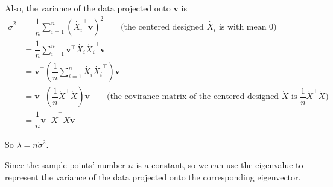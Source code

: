 Also, the variance of the data projected onto $\mathbf{v}$ is
\begin{align*}
\dot{\sigma}^2 &= \dfrac{1}{n}\sum\limits_{i=1}^n \left(\dot{X_i}^{\top}\mathbf{v}\right)^2 \qquad \text{(the centered designed $\dot{X_i}$ is with mean 0)} \\
&= \dfrac{1}{n}\sum\limits_{i=1}^n \mathbf{v}^{\top}\dot{X_i}\dot{X_i}^{\top}\mathbf{v} \\
&= \mathbf{v}^{\top}\left(\dfrac{1}{n}\sum\limits_{i=1}^n\dot{X_i}\dot{X_i}^{\top}\right)\mathbf{v} \\
&= \mathbf{v}^{\top}\left(\dfrac{1}{n}\dot{X}^{\top}\dot{X}\right)\mathbf{v}\qquad \text{(the covirance matrix of the centered designed $\dot{X}$ is $\dfrac{1}{n}\dot{X}^{\top}\dot{X}$)} \\
&= \dfrac{1}{n}\mathbf{v}^{\top}\dot{X}^{\top}\dot{X}\mathbf{v}
\end{align*}

So $\lambda=n\dot{\sigma}^2$.

Since the sample points' number $n$ is a constant, so we can use the eigenvalue to represent the variance of the data projected onto the corresponding eigenvector.

\newpage